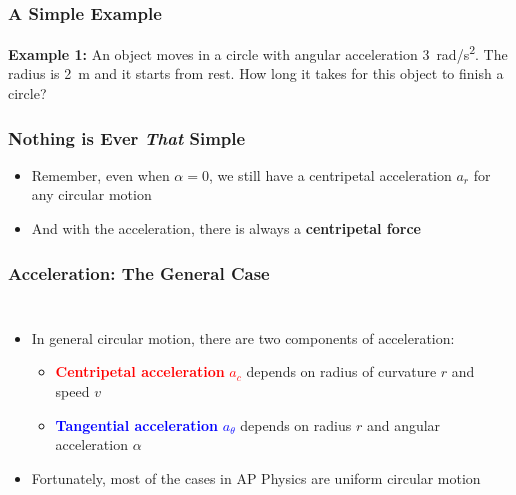\documentclass[12pt,compress,aspectratio=169]{beamer}
\begin{document}
\begin{frame}
  \frametitle{A Simple Example}
  \textbf{Example 1:} An object moves in a circle with angular acceleration
  \SI{3}{rad/\s^2}. The radius is \SI{2}{\metre} and it starts from rest. How
  long it takes for this object to finish a circle?
\end{frame}


\begin{frame}
  \frametitle{Nothing is Ever \emph{That} Simple}
  \begin{itemize}
  \item Remember, even when $\alpha=0$, we still have a centripetal
    acceleration $a_r$ for any circular motion


  \item And with the acceleration, there is always a \textbf{centripetal force}

  \end{itemize}
\end{frame}


\begin{frame}
  \frametitle{Acceleration: The General Case}
  \begin{columns}
    \begin{itemize}
    \item In general circular motion, there are two components of acceleration:
      \begin{itemize}
      \item\textcolor{red}{\textbf{Centripetal acceleration} $a_c$} depends on
        radius of curvature $r$ and speed $v$
      \item \textcolor{blue}{\textbf{Tangential acceleration} $a_\theta$}
        depends on radius $r$  and angular acceleration $\alpha$
      \end{itemize}
    \item Fortunately, most of the cases in AP Physics are uniform circular
      motion
    \end{itemize}
  \end{columns}
\end{frame}
\end{document}
